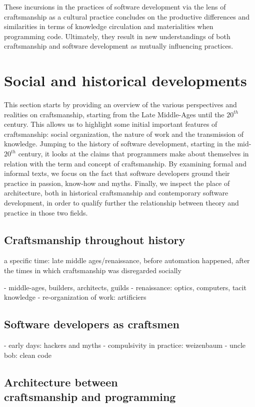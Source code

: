 \documentclass{article}
\begin{document}
These incursions in the practices of software development via the lens of craftsmanship as a cultural practice concludes on the productive differences and similarities in terms of knowledge circulation and materialities when programming code. Ultimately, they result in new understandings of both craftsmanship and software development as mutually influencing practices.

\section{Social and historical developments}

This section starts by providing an overview of the various perspectives and realities on craftsmanship, starting from the Late Middle-Ages until the $20^{th}$ century. This allows us to highlight some initial important features of craftsmanship: social organization, the nature of work and the transmission of knowledge. Jumping to the history of software development, starting in the mid-$20^{th}$ century, it looks at the claims that programmers make about themselves in relation with the term and concept of craftsmanship. By examining formal and informal texts, we focus on the fact that software developers ground their practice in passion, know-how and myths. Finally, we inspect the place of architecture, both in historical craftsmanship and contemporary software development, in order to qualify further the relationship between theory and practice in those two fields.

\subsection{Craftsmanship throughout history}

a specific time: late middle ages/renaissance, before automation happened, after the times in which craftsmanship was disregarded socially

- middle-ages, builders, architects, guilds
- renaissance: optics, computers, tacit knowledge
- re-organization of work: artificiers

\subsection{Software developers as craftsmen}

- early days: hackers and myths
- compulsivity in practice: weizenbaum
- uncle bob: clean code

\subsection{Architecture between\\craftsmanship and programming}
\end{document}
